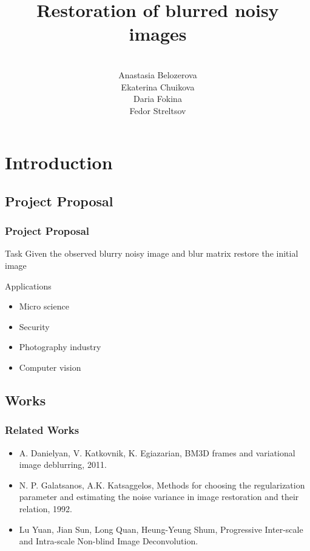 \documentclass[hyperref={pdfpagelabels=false}]{beamer}
\title[Image restoration] {Restoration of blurred noisy images}
\author[Projectors]{\large \\Anastasia Belozerova \\ Ekaterina Chuikova \\ Daria Fokina \\ Fedor Streltsov}
\institute[Skoltech]{Skolkovo Institute of Science and Technology
    \vspace{0.3cm} \\
	Courses: Optimization Methods, NLA }
\date{}
\begin{document}
\begin{frame}
\titlepage
\end{frame} 
\section{Introduction} 
\subsection{Project Proposal}
\begin{frame}
\frametitle{Project Proposal} 
\begin{block}{Task}
Given the observed blurry noisy image and blur matrix restore the initial image
\end{block}

\begin{block}{Applications}
\begin{itemize}
\item Micro science
\item Security 
\item Photography industry
\item Computer vision 
\end{itemize}

\end{block}

\end{frame}

\subsection{Works}
\begin{frame}
\frametitle{Related Works} 
\begin{itemize}
\item A. Danielyan, V. Katkovnik, K. Egiazarian, BM3D frames and variational image deblurring, 2011.
\item N. P. Galatsanos, A.K. Katsaggelos, Methods for choosing the regularization parameter and estimating the noise variance in image restoration and their relation, 1992.
\item Lu Yuan, Jian Sun, Long Quan, Heung-Yeung Shum, Progressive Inter-scale and Intra-scale Non-blind Image Deconvolution.

\end{itemize}
\end{frame}
\end{document}
